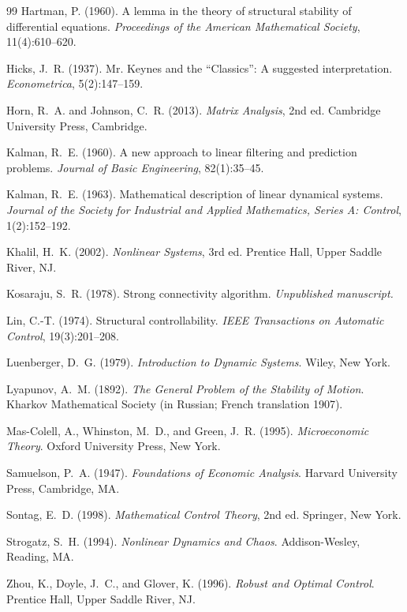 ﻿\documentclass[12pt, a4paper, titlepage]{report}
\theoremstyle{definition}
\theoremstyle{remark}
\begin{document}
\begin{thebibliography}{99}
Hartman, P. (1960).
\newblock A lemma in the theory of structural stability of differential equations.
\newblock \textit{Proceedings of the American Mathematical Society},
  11(4):610--620.

Hicks, J.~R. (1937).
\newblock Mr. Keynes and the ``Classics'': A suggested interpretation.
\newblock \textit{Econometrica}, 5(2):147--159.

Horn, R.~A. and Johnson, C.~R. (2013).
\newblock \textit{Matrix Analysis}, 2nd ed.
\newblock Cambridge University Press, Cambridge.

Kalman, R.~E. (1960).
\newblock A new approach to linear filtering and prediction problems.
\newblock \textit{Journal of Basic Engineering}, 82(1):35--45.

Kalman, R.~E. (1963).
\newblock Mathematical description of linear dynamical systems.
\newblock \textit{Journal of the Society for Industrial and Applied Mathematics,
  Series A: Control}, 1(2):152--192.

Khalil, H.~K. (2002).
\newblock \textit{Nonlinear Systems}, 3rd ed.
\newblock Prentice Hall, Upper Saddle River, NJ.

Kosaraju, S.~R. (1978).
\newblock Strong connectivity algorithm.
\newblock \textit{Unpublished manuscript.}

Lin, C.-T. (1974).
\newblock Structural controllability.
\newblock \textit{IEEE Transactions on Automatic Control}, 19(3):201--208.

Luenberger, D.~G. (1979).
\newblock \textit{Introduction to Dynamic Systems}.
\newblock Wiley, New York.

Lyapunov, A.~M. (1892).
\newblock \textit{The General Problem of the Stability of Motion}.
\newblock Kharkov Mathematical Society (in Russian; French translation 1907).

Mas-Colell, A., Whinston, M.~D., and Green, J.~R. (1995).
\newblock \textit{Microeconomic Theory}.
\newblock Oxford University Press, New York.

Samuelson, P.~A. (1947).
\newblock \textit{Foundations of Economic Analysis}.
\newblock Harvard University Press, Cambridge, MA.

Sontag, E.~D. (1998).
\newblock \textit{Mathematical Control Theory}, 2nd ed.
\newblock Springer, New York.

Strogatz, S.~H. (1994).
\newblock \textit{Nonlinear Dynamics and Chaos}.
\newblock Addison-Wesley, Reading, MA.

Zhou, K., Doyle, J.~C., and Glover, K. (1996).
\newblock \textit{Robust and Optimal Control}.
\newblock Prentice Hall, Upper Saddle River, NJ.

\end{thebibliography}
\end{document}
